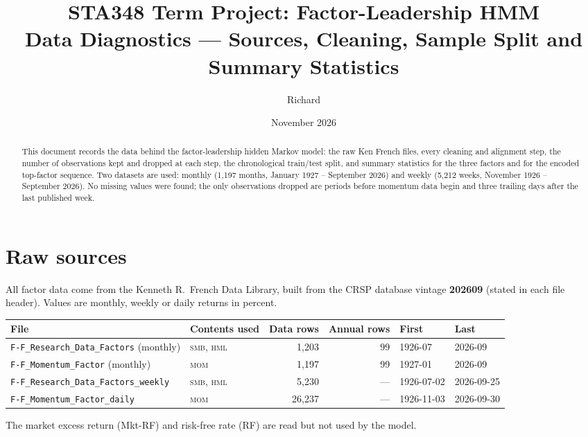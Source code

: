 \documentclass[11pt]{article}
\title{STA348 Term Project: Factor-Leadership HMM\\[4pt]\large Data Diagnostics --- Sources, Cleaning, Sample Split and Summary Statistics}
\author{Richard}
\date{November 2026}
\newcommand{\SMB}{\textsc{smb}}
\newcommand{\HML}{\textsc{hml}}
\newcommand{\MOM}{\textsc{mom}}
\begin{document}
\maketitle

\begin{abstract}
\noindent This document records the data behind the factor-leadership hidden Markov model: the raw Ken French files, every cleaning and alignment step, the number of observations kept and dropped at each step, the chronological train/test split, and summary statistics for the three factors and for the encoded top-factor sequence. Two datasets are used: monthly (1{,}197 months, January 1927 -- September 2026) and weekly (5{,}212 weeks, November 1926 -- September 2026). No missing values were found; the only observations dropped are periods before momentum data begin and three trailing days after the last published week.
\end{abstract}

\tableofcontents

\section{Raw sources}

All factor data come from the Kenneth R.\ French Data Library, built from the CRSP database vintage \textbf{202609} (stated in each file header). Values are monthly, weekly or daily returns in percent.

\begin{center}
\small
\begin{tabularx}{\textwidth}{@{}lXrrll@{}}
\toprule
File & Contents used & Data rows & Annual rows & First & Last \\
\midrule
\texttt{F-F\_Research\_Data\_Factors} (monthly) & \SMB, \HML{} & 1{,}203 & 99 & 1926-07 & 2026-09 \\
\texttt{F-F\_Momentum\_Factor} (monthly) & \MOM & 1{,}197 & 99 & 1927-01 & 2026-09 \\
\texttt{F-F\_Research\_Data\_Factors\_weekly} & \SMB, \HML{} & 5{,}230 & --- & 1926-07-02 & 2026-09-25 \\
\texttt{F-F\_Momentum\_Factor\_daily} & \MOM & 26{,}237 & --- & 1926-11-03 & 2026-09-30 \\
\bottomrule
\end{tabularx}
\end{center}
The market excess return (Mkt-RF) and risk-free rate (RF) are read but not used by the model.
\end{document}
